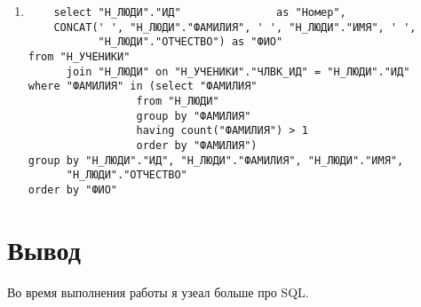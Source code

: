 \documentclass{article}
\begin{document}
\begin{enumerate}
        
        
  \item \begin{lstlisting}
    select "Н_ЛЮДИ"."ИД"               as "Номер",
    CONCAT(' ', "Н_ЛЮДИ"."ФАМИЛИЯ", ' ', "Н_ЛЮДИ"."ИМЯ", ' ',
           "Н_ЛЮДИ"."ОТЧЕСТВО") as "ФИО"
from "Н_УЧЕНИКИ"
      join "Н_ЛЮДИ" on "Н_УЧЕНИКИ"."ЧЛВК_ИД" = "Н_ЛЮДИ"."ИД"
where "ФАМИЛИЯ" in (select "ФАМИЛИЯ"
                 from "Н_ЛЮДИ"
                 group by "ФАМИЛИЯ"
                 having count("ФАМИЛИЯ") > 1
                 order by "ФАМИЛИЯ")
group by "Н_ЛЮДИ"."ИД", "Н_ЛЮДИ"."ФАМИЛИЯ", "Н_ЛЮДИ"."ИМЯ",
      "Н_ЛЮДИ"."ОТЧЕСТВО"
order by "ФИО"
\end{lstlisting}
        
        
\end{enumerate}

\section{Вывод}
Во время выполнения работы я узеал больше про SQL.
\end{document}
